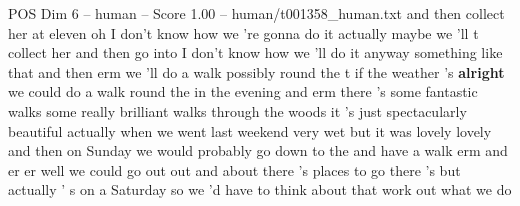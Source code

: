 \begin{textsample}{POS Dim 6 – human – Score 1.00 – human/t001358\_human.txt}  \label{ex:f6_pos_010}
and then collect her at eleven oh I don't know how we 're gonna do it actually maybe we 'll t collect her and then go into I don't know how we 'll do it anyway something like that and then erm we 'll do a walk possibly round the t if the weather 's \textbf{alright} we could do a walk round the in the evening and erm there 's some fantastic walks some really brilliant walks through the woods it 's just spectacularly beautiful actually when we went last weekend very wet but it was lovely lovely and then on Sunday we would probably go down to the and have a walk erm and er er well we could go out out and about there 's places to go there 's but actually ' s on a Saturday so we 'd have to think about that work out what we do

\end{textsample}

